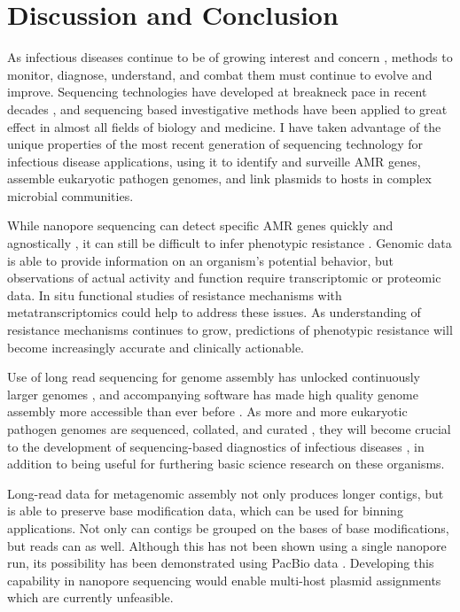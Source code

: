\chapter{Discussion and Conclusion}
\label{chap:conclusion}

As infectious diseases continue to be of growing interest and concern \citep{Baker2022-eb}, methods to monitor, diagnose, understand, and combat them must continue to evolve and improve. Sequencing technologies have developed at breakneck pace in recent decades \citep{Hu2021-dd, Schatz2013-vw}, and sequencing based investigative methods have been applied to great effect in almost all fields of biology and medicine. I have taken advantage of the unique properties of the most recent generation of sequencing technology for infectious disease applications, using it to identify and surveille AMR genes, assemble eukaryotic pathogen genomes, and link plasmids to hosts in complex microbial communities.

While nanopore sequencing can detect specific AMR genes quickly and agnostically \citep{Tamma2019-jg}, it can still be difficult to infer phenotypic resistance \citep{Yee2021-td}. Genomic data is able to provide information on an organism’s potential behavior, but observations of actual activity and function require transcriptomic or proteomic data. In situ functional studies of resistance mechanisms with metatranscriptomics could help to address these issues. As understanding of resistance mechanisms continues to grow, predictions of phenotypic resistance will become increasingly accurate and clinically actionable.

Use of long read sequencing for genome assembly has unlocked continuously larger genomes \citep{Neale2014-di}, and accompanying software has made high quality genome assembly more accessible than ever before \citep{Fan2021-cq}. As more and more eukaryotic pathogen genomes are sequenced, collated, and curated \citep{Aurrecoechea2017-tl}, they will become crucial to the development of sequencing-based diagnostics of infectious diseases \citep{Lu2018-wr}, in addition to being useful for furthering basic science research on these organisms.

Long-read data for metagenomic assembly not only produces longer contigs, but is able to preserve base modification data, which can be used for binning applications. Not only can contigs be grouped on the bases of base modifications, but reads can as well. Although this has not been shown using a single nanopore run, its possibility has been demonstrated using PacBio data \citep{Beaulaurier2018-mu}. Developing this capability in nanopore sequencing would enable multi-host plasmid assignments which are currently unfeasible.
